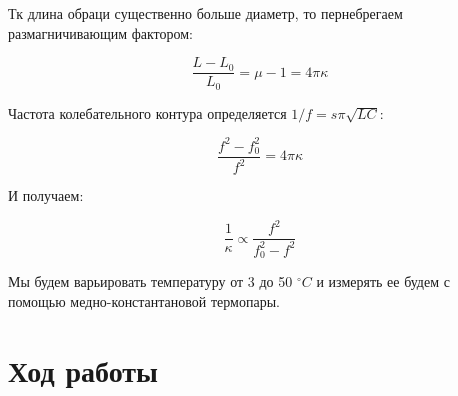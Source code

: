 \documentclass[a4paper]{article}
\begin{document}
Тк длина обраци существенно больше диаметр, то пернебрегаем размагничивающим фактором:

\begin{equation}
    \frac{L-L_0}{L_0} = \mu -1 = 4 \pi \kappa
\end{equation}

Частота колебательного контура определяется $1/f = s \pi \sqrt{LC}$:

\begin{equation}
    \frac{f^2 - f_0^2}{f^2} = 4 \pi \kappa
\end{equation}

И получаем:

\begin{equation}
    \frac{1}{\kappa} \propto \frac{f^2}{f_0^2 - f^2}
\end{equation}

Мы будем варьировать температуру от 3 до 50 $^{\circ} C$ и измерять ее будем с помощью медно-константановой термопары. 

\newpage

\section{Ход работы}
\end{document}
